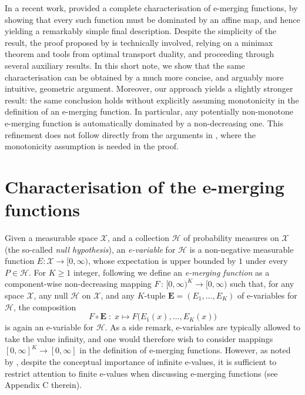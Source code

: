 \documentclass[3p, authoryear, 10pt]{elsarticle}%
\newcommand{\Hh}{\mathcal H}
\newcommand{\X}{\mathcal X}
\begin{document}
In a recent work, \cite{wang25only} provided a complete characterisation of e-merging functions, by showing that every such function must be dominated by an affine map, and hence yielding a remarkably simple final description. Despite the simplicity of the result, the proof proposed by \cite{wang25only} is technically involved, relying on a minimax theorem and tools from optimal transport duality, and proceeding through several auxiliary results. In this short note, we show that the same characterisation can be obtained by a much more concise, and arguably more intuitive, geometric argument. Moreover, our approach yields a slightly stronger result: the same conclusion holds without explicitly assuming monotonicity in the definition of an e-merging function. In particular, any potentially non-monotone e-merging function is automatically dominated by a non-decreasing one. This refinement does not follow directly from the arguments in \cite{wang25only}, where the monotonicity assumption is needed in the proof.

\section{Characterisation of the e-merging functions}
Given a measurable space $\X$, and a collection $\Hh$ of probability measures on $\X$ (the so-called \emph{null hypothesis}), an \emph{e-variable} for $\Hh$ is a non-negative measurable function $E:\X\to[0,\infty)$, whose expectation is upper bounded by $1$ under every $P\in\Hh$. For $K\geq 1$ integer, following \cite{wang25only} we define an \emph{e-merging function} as a component-wise non-decreasing mapping
$F\,:\,[0,\infty)^K\to[0,\infty)$ such that, for any space $\X$, any null $\Hh$ on $\X$, and any $K$-tuple $\mathbf E = (E_1,\dots, E_K)$ of e-variables for $\Hh$, the composition
$$F\circ\mathbf E\;:\;x\mapsto F\big(E_1(x),\dots, E_K(x)\big)$$ is again an e-variable for $\Hh$. As a side remark, e-variables are typically allowed to take the value infinity, and one would therefore wish to consider mappings $[0,\infty]^K \to [0,\infty]$ in the definition of e-merging functions. However, as noted by \cite{vovk2021evalues}, despite the conceptual importance of infinite e-values, it is sufficient to restrict attention to finite e-values when discussing e-merging functions (see Appendix C therein).
\end{document}
